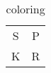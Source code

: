 \documentclass{article}
\begin{document}
	\begin{table}
		\centering
	
	\begin{tabular}{|c|c}
			
			\huge \cellcolor{green}S & \huge \cellcolor{red}P\\
			\huge \cellcolor{pink}K & \huge \cellcolor{yellow}R
			
			
		\end{tabular}
	\caption{coloring}
	\end{table}
\end{document}
